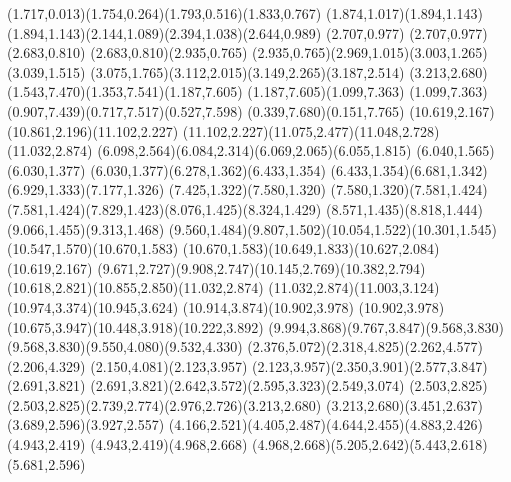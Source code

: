 \documentclass[10pt]{article}
\begin{document}
{{(1.717,0.013)(1.754,0.264)(1.793,0.516)(1.833,0.767)%
(1.874,1.017)(1.894,1.143)\relax
{}(1.894,1.143)(2.144,1.089)(2.394,1.038)(2.644,0.989)%
(2.707,0.977)\relax
{}(2.707,0.977)(2.683,0.810)\relax
{}(2.683,0.810)(2.935,0.765)\relax
{}(2.935,0.765)(2.969,1.015)(3.003,1.265)(3.039,1.515)%
(3.075,1.765)(3.112,2.015)(3.149,2.265)(3.187,2.514)%
(3.213,2.680)\relax
{}(1.543,7.470)(1.353,7.541)(1.187,7.605)\relax
{}(1.187,7.605)(1.099,7.363)\relax
{}(1.099,7.363)(0.907,7.439)(0.717,7.517)(0.527,7.598)%
(0.339,7.680)(0.151,7.765)\relax
{}(10.619,2.167)(10.861,2.196)(11.102,2.227)\relax
{}(11.102,2.227)(11.075,2.477)(11.048,2.728)(11.032,2.874)%
\relax
{}(6.098,2.564)(6.084,2.314)(6.069,2.065)(6.055,1.815)%
(6.040,1.565)(6.030,1.377)\relax
{}(6.030,1.377)(6.278,1.362)(6.433,1.354)\relax
{}(6.433,1.354)(6.681,1.342)(6.929,1.333)(7.177,1.326)%
(7.425,1.322)(7.580,1.320)\relax
{}(7.580,1.320)(7.581,1.424)\relax
{}(7.581,1.424)(7.829,1.423)(8.076,1.425)(8.324,1.429)%
(8.571,1.435)(8.818,1.444)(9.066,1.455)(9.313,1.468)%
(9.560,1.484)(9.807,1.502)(10.054,1.522)(10.301,1.545)%
(10.547,1.570)(10.670,1.583)\relax
{}(10.670,1.583)(10.649,1.833)(10.627,2.084)(10.619,2.167)%
\relax
{}(9.671,2.727)(9.908,2.747)(10.145,2.769)(10.382,2.794)%
(10.618,2.821)(10.855,2.850)(11.032,2.874)\relax
{}(11.032,2.874)(11.003,3.124)(10.974,3.374)(10.945,3.624)%
(10.914,3.874)(10.902,3.978)\relax
{}(10.902,3.978)(10.675,3.947)(10.448,3.918)(10.222,3.892)%
(9.994,3.868)(9.767,3.847)(9.568,3.830)\relax
{}(9.568,3.830)(9.550,4.080)(9.532,4.330)\relax
{}(2.376,5.072)(2.318,4.825)(2.262,4.577)(2.206,4.329)%
(2.150,4.081)(2.123,3.957)\relax
{}(2.123,3.957)(2.350,3.901)(2.577,3.847)(2.691,3.821)%
\relax
{}(2.691,3.821)(2.642,3.572)(2.595,3.323)(2.549,3.074)%
(2.503,2.825)\relax
{}(2.503,2.825)(2.739,2.774)(2.976,2.726)(3.213,2.680)%
\relax
{}(3.213,2.680)(3.451,2.637)(3.689,2.596)(3.927,2.557)%
(4.166,2.521)(4.405,2.487)(4.644,2.455)(4.883,2.426)%
(4.943,2.419)\relax
{}(4.943,2.419)(4.968,2.668)\relax
{}(4.968,2.668)(5.205,2.642)(5.443,2.618)(5.681,2.596)%
}}
\end{document}
